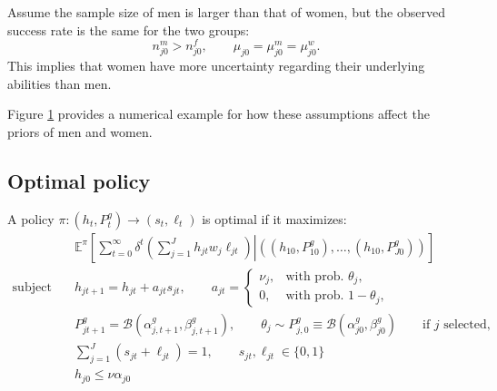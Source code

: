 \documentclass[10 pt]{article}
\newcommand{\sbr}[1]{\left[ #1 \right]}
\newcommand{\pr}[1]{\left( #1 \right)}
\begin{document}
Assume the sample size of men is larger than that of women, but the observed success rate is the same for the two groups:
\begin{equation*}
  n_{j0}^m > n_{j0}^f, \quad \quad \mu_{j0} = \mu_{j0}^m = \mu_{j0}^w.
\end{equation*}
This implies that women have more uncertainty regarding their underlying abilities than men.  
\begin{figure}
\centering

\caption{}
\label{beta_distribution}
\end{figure}
Figure \ref{beta_distribution} provides a numerical example for how these assumptions affect the priors of men and women. 

\subsection{Optimal policy}

A policy $\pi: (h_t, P_t^g) \to (s_t, \ell_t)$ is optimal if it maximizes:
\begin{align*}
& \mathbb{E}^\pi \sbr{
   \sum_{t=0}^\infty \delta^t 
   \left. \pr{\sum_{j=1}^J h_{jt} w_j \ell_{jt} } \right\vert
   \pr{(h_{10}, P_{10}^g), \dots, (h_{10}, P_{J0}^g)}
} \\
\text{subject to} \quad& h_{jt+1} = h_{jt}+ a_{jt} s_{jt}, \quad \quad a_{jt} = 
   \begin{cases} 
      \nu_j, & \text{with prob. } \theta_j,  \\ 
      0, & \text{with prob. } 1 - \theta_j,
   \end{cases} 
   \\
\quad& P_{jt+1}^g = 
  \mathcal{B} (\alpha_{j,t+1}^g, \beta_{j,t+1}^g), 
  \quad \quad \theta_j \sim P_{j,0}^g \equiv \mathcal{B} (\alpha_{j0}^g, \beta_{j0}^g)
  \quad \quad \text{if $j$ selected,} \\
\quad& \sum_{j=1}^J (s_{jt} + \ell_{jt}) = 1, \quad \quad s_{jt}, \ell_{jt} \in \{0,1\} \\
   & h_{j0} \leq \nu \alpha_{j0}
\end{align*}
\end{document}
